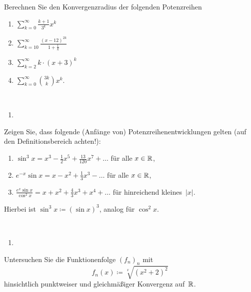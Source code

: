 \begin{aufg}[6 Punkte]
Berechnen Sie den Konvergenzradius der folgenden Potenzreihen
\begin{enumerate}[label=$\mathrm{(\roman*)}$, ref=$\mathrm{\roman*}$]
\item $\sum_{k=0}^\infty \frac{k+1}{3^k}x^k$
\item $\sum_{k=10}^\infty \frac{(x-12)^{2k}}{1+\frac{1}{k}}$
\item $\sum_{k=2}^\infty k\cdot (x+3)^k$
\item $\sum_{k=0}^\infty \binom{3k}{k} x^k$.
\end{enumerate}
\end{aufg}
 
\bigskip


\begin{lsg}\mbox{ }
\begin{enumerate}[label=$\mathrm{(\roman*)}$, ref=$\mathrm{\roman*}$]
\item 
\end{enumerate}
\end{lsg}


\bigskip


\begin{aufg}[6 Punkte]
Zeigen Sie, dass folgende (Anf\"ange von) Potenzreihenentwicklungen gelten (auf 
den Definitionsbereich achten!):
\begin{enumerate}[label=$\mathrm{(\roman*)}$, ref=$\mathrm{\roman*}$]
\item $\sin^3 x = x^3 -\frac12x^5 + \frac{13}{120}x^7 + \ldots$ f\"ur alle 
$x\in\mathbb{R}$,
\item $e^{-x}\sin x = x - x^2 + \frac13x^3 - \ldots$ f\"ur alle $x\in\mathbb{R}$,
\item $\frac{e^x \sin x}{\cos^2 x} = x + x^2 + \frac43 x^3 + x^4 + \ldots$ 
f\"ur hinreichend kleines~$|x|$.
\end{enumerate}
Hierbei ist $\sin^3 x \coloneqq (\sin x)^3$, analog f\"ur $\cos^2 x$.
\end{aufg}


\bigskip


\begin{lsg}\mbox{ }
\begin{enumerate}[label=$\mathrm{(\roman*)}$, ref=$\mathrm{\roman*}$]
\item
\end{enumerate}
\end{lsg}

\bigskip


\begin{aufg}
Untersuchen Sie die Funktionenfolge $(f_n)_n$ mit 
\[
 f_n(x) \coloneqq \sqrt[x]{(x^2+2)^2}
\]
hinsichtlich punktweiser und gleichm\"a{\ss}iger Konvergenz auf~$\mathbb{R}$.
\end{aufg}


